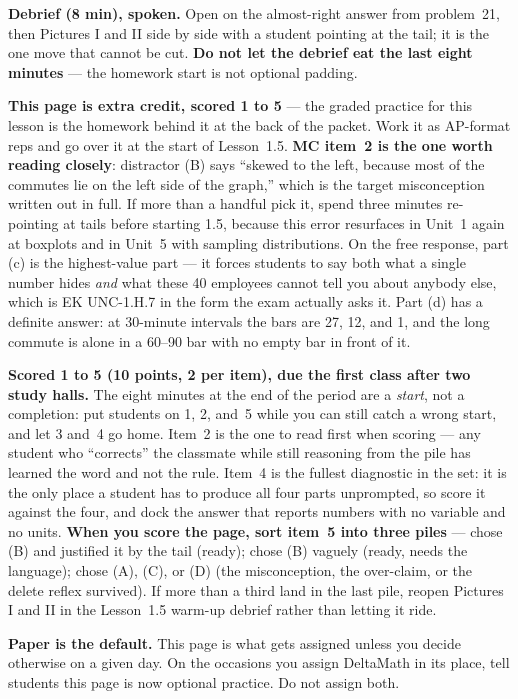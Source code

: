 \documentclass[10pt]{article}
\begin{document}
\begin{teachernote}
\textbf{Debrief (8 min), spoken.} Open on the almost-right answer from problem~21, then
Pictures I and II side by side with a student pointing at the tail; it is the one move that
cannot be cut. \textbf{Do not let the debrief eat the last eight minutes} --- the homework start
is not optional padding.
\end{teachernote}

\begin{teachernote}[AP Practice]
\textbf{This page is extra credit, scored 1 to 5} --- the graded practice for this lesson is the
homework behind it at the back of the packet. Work it as AP-format reps and go over it at the
start of Lesson~1.5. \textbf{MC item~2 is the one worth reading closely}: distractor (B) says
``skewed to the left, because most of the commutes lie on the left side of the graph,'' which is
the target misconception written out in full. If more than a handful pick it, spend three
minutes re-pointing at tails before starting 1.5, because this error resurfaces in Unit~1 again
at boxplots and in Unit~5 with sampling distributions. On the free response, part (c) is the
highest-value part --- it forces students to say both what a single number hides \emph{and} what
these 40 employees cannot tell you about anybody else, which is EK UNC-1.H.7 in the form the
exam actually asks it. Part (d) has a definite answer: at 30-minute intervals the bars are 27,
12, and 1, and the long commute is alone in a 60--90 bar with no empty bar in front of it.
\end{teachernote}

\begin{teachernote}[Homework]
\textbf{Scored 1 to 5 (10 points, 2 per item), due the first class after two study halls.} The eight
minutes at the end of the period are a \emph{start}, not a completion: put students on 1, 2,
and~5 while you can still catch a wrong start, and let 3 and~4 go home. Item~2 is the one to
read first when scoring --- any student who ``corrects'' the classmate while still reasoning
from the pile has learned the word and not the rule. Item~4 is the fullest diagnostic in the
set: it is the only place a student has to produce all four parts unprompted, so score it
against the four, and dock the answer that reports numbers with no variable and no units.
\textbf{When you score the page, sort item~5 into three piles} --- chose (B) and justified it by
the tail (ready); chose (B) vaguely (ready, needs the language); chose (A), (C), or (D) (the
misconception, the over-claim, or the delete reflex survived). If more than a third land in the
last pile, reopen Pictures I and II in the Lesson~1.5 warm-up debrief rather than letting it
ride.

\textbf{Paper is the default.} This page is what gets assigned unless you decide otherwise on a
given day. On the occasions you assign DeltaMath in its place, tell students this page is now optional practice. Do not assign both.
\end{teachernote}
\end{document}
